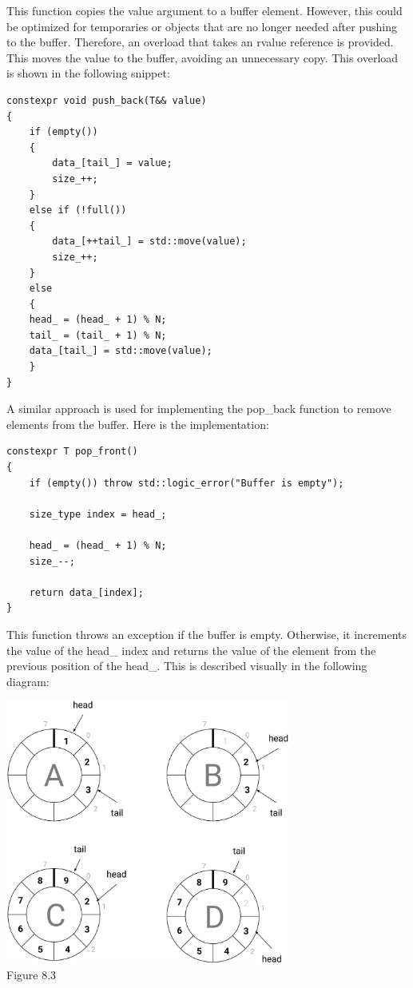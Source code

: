 This function copies the value argument to a buffer element. However, this could be optimized for temporaries or objects that are no longer needed after pushing to the buffer. Therefore, an overload that takes an rvalue reference is provided. This moves the value to the buffer, avoiding an unnecessary copy. This overload is shown in the following snippet:

\begin{lstlisting}[style=styleCXX]
constexpr void push_back(T&& value)
{
	if (empty())
	{
		data_[tail_] = value;
		size_++;
	}
	else if (!full())
	{
		data_[++tail_] = std::move(value);
		size_++;
	}
	else
	{
	head_ = (head_ + 1) % N;
	tail_ = (tail_ + 1) % N;
	data_[tail_] = std::move(value);
	}
}
\end{lstlisting}

A similar approach is used for implementing the pop\_back function to remove elements from the buffer. Here is the implementation:

\begin{lstlisting}[style=styleCXX]
constexpr T pop_front()
{
	if (empty()) throw std::logic_error("Buffer is empty");
	
	size_type index = head_;
	
	head_ = (head_ + 1) % N;
	size_--;
	
	return data_[index];
}
\end{lstlisting}

This function throws an exception if the buffer is empty. Otherwise, it increments the value of the head\_ index and returns the value of the element from the previous position of the head\_. This is described visually in the following diagram:

\begin{center}
\includegraphics[width=0.7\textwidth]{content/3/chapter8/images/3.png}\\
Figure 8.3
\end{center}

